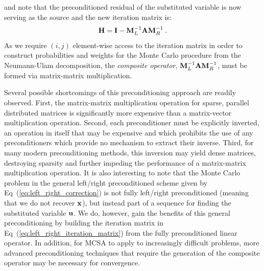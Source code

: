 and note that the preconditioned residual of the substituted variable
is now serving as the source and the new iteration matrix is:
\begin{equation}
  \mathbf{H} = \mathbf{I} - \mathbf{M}_L^{-1}\mathbf{A}\mathbf{M}_R^{-1}\:.
  \label{eq:left_right_iteration_matrix}
\end{equation}
As we require $(i,j)$ element-wise access to the iteration matrix in
order to construct probabilities and weights for the Monte Carlo
procedure from the Neumann-Ulam decomposition, the \textit{composite
  operator}, $\mathbf{M}_L^{-1}\mathbf{A}\mathbf{M}_R^{-1}$, must be formed via
matrix-matrix multiplication. 

Several possible shortcomings of this preconditioning approach are
readily observed. First, the matrix-matrix multiplication operation
for sparse, parallel distributed matrices is significantly more
expensive than a matrix-vector multiplication operation. Second, each
preconditioner must be explicitly inverted, an operation in itself
that may be expensive and which prohibits the use of any
preconditioners which provide no mechanism to extract their
inverse. Third, for many modern preconditioning methods, this
inversion may yield dense matrices, destroying sparsity and further
impeding the performance of a matrix-matrix multiplication
operation. It is also interesting to note that the Monte Carlo problem
in the general left/right preconditioned scheme given by
Eq~(\ref{eq:left_right_correction}) is not fully left/right
preconditioned (meaning that we do not recover $\mathbf{x}$), but instead
part of a sequence for finding the substituted variable $\mathbf{u}$. We
do, however, gain the benefits of this general preconditioning by
building the iteration matrix in
Eq~(\ref{eq:left_right_iteration_matrix}) from the fully
preconditioned linear operator. In addition, for MCSA to apply to
increasingly difficult problems, more advanced preconditioning
techniques that require the generation of the composite operator may
be necessary for convergence.

